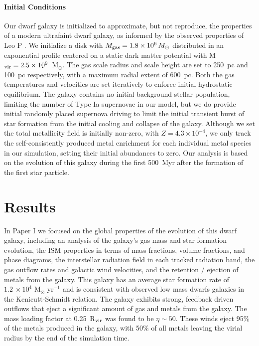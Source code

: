 \documentclass[twocolumn]{aastex61}
\begin{document}
\paragraph{Initial Conditions} Our dwarf galaxy is initialized to approximate, but not reproduce, the 
properties of 
    a modern
ultrafaint dwarf galaxy, as informed by the observed properties of Leo P \citep[see ][]{Giovanelli2013,McQuinn2015,McQuinn2015a}. We initialize a disk with $M_{\rm gas} = 1.8 \times 10^{6} \, M_{\odot}$ distributed in an exponential profile centered on a static \cite{Burkert1995} dark matter potential with 
M$_{\rm vir} = 2.5 \times 10^{9}$~M$_{\odot}$. 
The gas scale radius and scale height are set to 250~pc and 100~pc respectively, with a maximum radial extent of 600~pc. Both the gas temperatures and velocities are set iteratively to enforce initial hydrostatic equilibrium. The galaxy contains no initial background stellar population, limiting the number of Type Ia supernovae in our model, but we do provide initial 
   randomly placed 
supernova driving to limit the initial transient burst of star formation from the initial cooling and collapse of the galaxy. Although we set the total metallicity field is initially non-zero, with $Z = 4.3 \times 10^{-4}$, we only track the self-consistently produced metal enrichment for each individual metal species in our simulation, setting their initial abundances to zero. Our analysis is based on the evolution of this galaxy during the first 500~Myr after the formation of the first star particle.

\section{Results}
     In
Paper I we focused on the global properties of the evolution of this dwarf galaxy, including an analysis of the galaxy's gas mass and star formation evolution, the ISM properties in terms of mass fractions, volume fractions, and phase diagrams, the interstellar radiation field in each tracked radiation band, the gas outflow rates and galactic wind velocities, and the retention / ejection of metals from the galaxy. This galaxy has an average star formation rate of $1.2~\times 10^{4}$ M$_{\odot}$ yr$^{-1}$ and is consistent with observed low mass dwarfs galaxies in the Kenicutt-Schmidt relation.  The galaxy exhibits strong, feedback driven outflows that eject a significant amount of gas and metals from the galaxy. The mass loading factor at 0.25~R$_{\rm vir}$ was found to be $\eta \sim 50$. These winds eject 95\% of the metals produced in the galaxy, with 50\% of all metals leaving the virial radius by the end of the simulation time.
\end{document}
